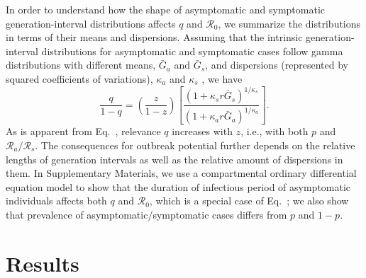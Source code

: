 In order to understand how the shape of asymptomatic and symptomatic generation-interval distributions affects $q$ and $\mathcal R_0$, we summarize the distributions in terms of their means and dispersions.
Assuming that the intrinsic generation-interval distributions for asymptomatic and symptomatic cases follow gamma distributions with different means, $\bar G_a$ and $\bar G_s$, and dispersions (represented by squared coefficients of variations), $\kappa_a$ and $\kappa_s$ \citep{park_2019practical}, 
we have
\begin{equation}
\frac{q}{1-q}=\left(\frac{z}{1-z}\right)\left[\frac{(1 + \kappa_s r \bar G_s)^{1/\kappa_s}}{(1 + \kappa_a r \bar G_a)^{1/\kappa_a}}\right].
\label{eq.gammaratio}
\end{equation}
As is apparent from Eq.~, relevance $q$ increases with $z$, i.e., with both $p$ and $\mathcal R_a/\mathcal R_s$. The consequences for outbreak potential further depends on the relative lengths of generation intervals as well as the relative amount of dispersions in them.
In Supplementary Materials, we use a compartmental ordinary differential equation model to show that the duration of infectious period of asymptomatic individuals affects both $q$ and $\mathcal R_0$, which is a special case of Eq.~; we also show that prevalence of asymptomatic/symptomatic cases differs from $p$ and $1-p$.

\section{Results}

